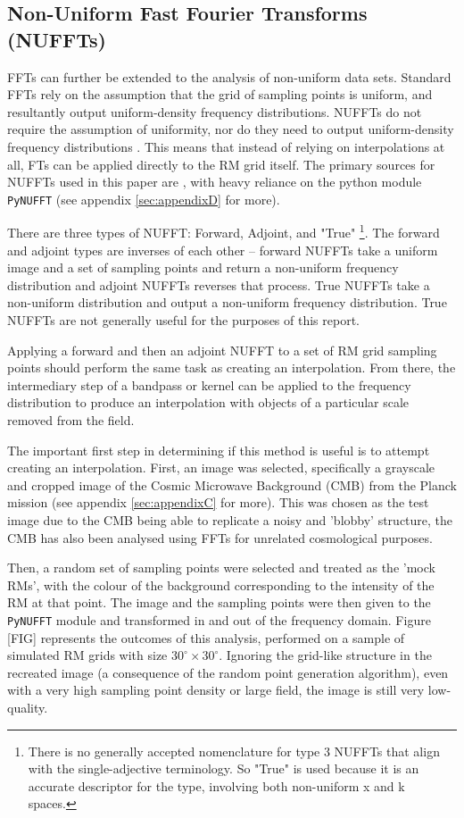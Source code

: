\subsection{Non-Uniform Fast Fourier Transforms (NUFFTs)}
\label{ssec:nuffts}

FFTs can further be extended to the analysis of non-uniform data sets. Standard FFTs rely on the assumption that the grid of sampling points is uniform, and resultantly output uniform-density frequency distributions. NUFFTs do not require the assumption of uniformity, nor do they need to output uniform-density frequency distributions \citep{ID55, ID57}. This means that instead of relying on interpolations at all, FTs can be applied directly to the RM grid itself. The primary sources for NUFFTs used in this paper are \cite{ID55, ID57}, with heavy reliance on the python module \verb|PyNUFFT| (see appendix \ref{sec:appendixD} for more).


There are three types of NUFFT: Forward, Adjoint, and "True" \footnote{There is no generally accepted nomenclature for type 3 NUFFTs that align with the single-adjective terminology. So "True" is used because it is an accurate descriptor for the type, involving both non-uniform x and k spaces.}. The forward and adjoint types are inverses of each other – forward NUFFTs take a uniform image and a set of sampling points and return a non-uniform frequency distribution and adjoint NUFFTs reverses that process. True NUFFTs take a non-uniform distribution and output a non-uniform frequency distribution. True NUFFTs are not generally useful for the purposes of this report.


Applying a forward and then an adjoint NUFFT to a set of RM grid sampling points should perform the same task as creating an interpolation. From there, the intermediary step of a bandpass or kernel can be applied to the frequency distribution to produce an interpolation with objects of a particular scale removed from the field.


The important first step in determining if this method is useful is to attempt creating an interpolation. First, an image was selected, specifically a grayscale and cropped image of the Cosmic Microwave Background (CMB) from the Planck mission (see appendix \ref{sec:appendixC} for more). This was chosen as the test image due to the CMB being able to replicate a noisy and 'blobby' structure, the CMB has also been analysed using FFTs for unrelated cosmological purposes.


Then, a random set of sampling points were selected and treated as the 'mock RMs', with the colour of the background corresponding to the intensity of the RM at that point. The image and the sampling points were then given to the \verb|PyNUFFT| module and transformed in and out of the frequency domain. Figure [FIG] represents the outcomes of this analysis, performed on a sample of simulated RM grids with size $30^{\circ}\times 30^{\circ}$. Ignoring the grid-like structure in the recreated image (a consequence of the random point generation algorithm), even with a very high sampling point density or large field, the image is still very low-quality.


